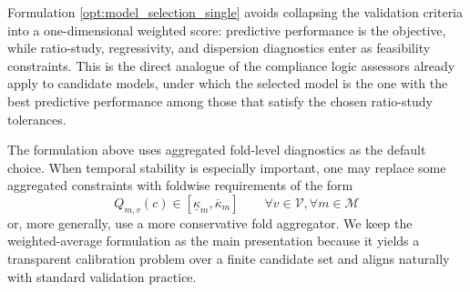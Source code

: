 \documentclass[12pt]{article}
\theoremstyle{plain}
\theoremstyle{definition}
\newcommand{\1}{\mathbf{1}}
\begin{document}
Formulation \eqref{opt:model_selection_single} avoids collapsing the validation criteria into a one-dimensional weighted score: predictive performance is the objective, while ratio-study, regressivity, and dispersion diagnostics enter as feasibility constraints. This is the direct analogue of the compliance logic assessors already apply to candidate models, under which the selected model is the one with the best predictive performance among those that satisfy the chosen ratio-study tolerances.


The formulation above uses aggregated fold-level diagnostics as the default choice. When temporal stability is especially important, one may replace some aggregated constraints with foldwise requirements of the form
\[
Q_{m,v}(c)\in[\underline{\kappa}_m,\overline{\kappa}_m]
\qquad
\forall v\in\mathcal V, \forall m \in \mathcal M
\]
or, more generally, use a more conservative fold aggregator. We keep the weighted-average formulation as the main presentation because it yields a transparent calibration problem over a finite candidate set and aligns naturally with standard validation practice.
\end{document}
